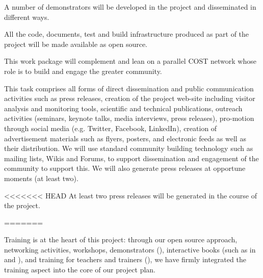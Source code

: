 \begin{workpackage}
\begin{wpdescription}
  A number of demonstrators will be developed in the project and
  disseminated in different ways.

  All the code, documents, test and build infrastructure produced as
  part of the project will be made available as open source.

  This work package will complement and lean on a parallel COST
  network whose role is to build and engage the greater community.
\end{wpdescription}

\begin{tasklist}

\begin{task}[title=Dissemination and Communication activities, lead=PS, id=dissemination-communication, PM=1, partners={LL,UV,UJF,UB,UO,USH,USO,SA,UW,JU,UK,US,ZH,SR,UWS} ]

  This task comprises all forms of direct dissemination and public
  communication activities such as press releases, creation of the
  project web-site including visitor analysis and monitoring tools,
  scientific and technical publications, outreach activities
  (seminars, keynote talks, media interviews, press releases),
  pro-motion through social media (e.g. Twitter, Facebook, LinkedIn),
  creation of advertisement materials such as flyers, posters, and
  electronic feeds as well as their distribution. We will use standard
  community building technology such as mailing lists, Wikis and
  Forums, to support dissemination and engagement of the community to
  support this. We will also generate press releases at opportune
  moments (at least two). %



<<<<<<< HEAD
  At least two press releases will be generated in the course of the
  project.

\end{task}

\begin{task}[title=Community building: development workshops, lead=PS,PM=12, partners={UB,UK,UJF,SR,SA,UW,USH}, id=devel-workshops]
=======
\end{task}


\begin{task}[title=Training and training portal,
id=training-portal,lead=PS,PM=1,wphases=0-1] 
Training is at the heart of this project: through our open source
approach, networking activities, workshops, demonstrators
(), interactive books (such
as in  and
), and training for teachers and trainers
(), we have firmly integrated the training
aspect into the core of our project plan.


\end{task}
\end{tasklist}
\end{workpackage}
